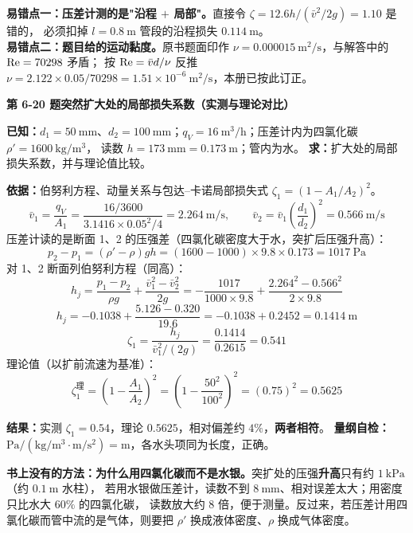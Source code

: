 \begin{yicuo}
\textbf{易错点一：压差计测的是"沿程 $+$ 局部"。}直接令 $\zeta=12.6h/(\bar v^2/2g)=1.10$ 是错的，
必须扣掉 $l=0.8\ \mathrm{m}$ 管段的沿程损失 $0.114\ \mathrm{m}$。\\
\textbf{易错点二：题目给的运动黏度。}原书题面印作 $\nu=0.000015\ \mathrm{m^2/s}$，与解答中的 $\mathrm{Re}=70298$ 矛盾；
按 $\mathrm{Re}=\bar vd/\nu$ 反推 $\nu=2.122\times0.05/70298=1.51\times10^{-6}\ \mathrm{m^2/s}$，本册已按此订正。
\end{yicuo}

\noindent\textbf{第 6-20 题\quad 突然扩大处的局部损失系数（实测与理论对比）}

\begin{jie}
\textbf{已知：}$d_1=50\ \mathrm{mm}$、$d_2=100\ \mathrm{mm}$；$q_V=16\ \mathrm{m^3/h}$；压差计内为四氯化碳 $\rho'=1600\ \mathrm{kg/m^3}$，
读数 $h=173\ \mathrm{mm}=0.173\ \mathrm{m}$；管内为水。
\textbf{求：}扩大处的局部损失系数，并与理论值比较。

\textbf{依据：}伯努利方程、动量关系与包达--卡诺局部损失式 $\zeta_1=(1-A_1/A_2)^2$。
\[ \bar v_1=\frac{q_V}{A_1}=\frac{16/3600}{3.1416\times0.05^2/4}=2.264\ \mathrm{m/s},\qquad
\bar v_2=\bar v_1\left(\frac{d_1}{d_2}\right)^2=0.566\ \mathrm{m/s} \]
压差计读的是断面 1、2 的压强差（四氯化碳密度大于水，突扩后压强升高）：
\[ p_2-p_1=(\rho'-\rho)gh=(1600-1000)\times9.8\times0.173=1017\ \mathrm{Pa} \]
对 1、2 断面列伯努利方程（同高）：
\[ h_j=\frac{p_1-p_2}{\rho g}+\frac{\bar v_1^2-\bar v_2^2}{2g}
=-\frac{1017}{1000\times9.8}+\frac{2.264^2-0.566^2}{2\times9.8} \]
\[ h_j=-0.1038+\frac{5.126-0.320}{19.6}=-0.1038+0.2452=0.1414\ \mathrm{m} \]
\[ \zeta_1=\frac{h_j}{\bar v_1^2/(2g)}=\frac{0.1414}{0.2615}=0.541 \]
理论值（以扩前流速为基准）：
\[ \zeta_1^{\text{理}}=\left(1-\frac{A_1}{A_2}\right)^2=\left(1-\frac{50^2}{100^2}\right)^2=(0.75)^2=0.5625 \]

\textbf{结果：}实测 $\zeta_1=0.54$，理论 $0.5625$，相对偏差约 $4\%$，\textbf{两者相符}。
\textbf{量纲自检：}$\mathrm{Pa/(kg/m^3\cdot m/s^2)}=\mathrm{m}$，各水头项同为长度，正确。
\end{jie}

\begin{tishi}
\textbf{书上没有的方法：为什么用四氯化碳而不是水银。}突扩处的压强\textbf{升高}只有约 $1\ \mathrm{kPa}$（约 $0.1\ \mathrm{m}$ 水柱），
若用水银做压差计，读数不到 $8\ \mathrm{mm}$、相对误差太大；用密度只比水大 $60\%$ 的四氯化碳，
读数放大约 $8$ 倍，便于测量。反过来，若压差计用四氯化碳而管中流的是气体，则要把 $\rho'$ 换成液体密度、$\rho$ 换成气体密度。
\end{tishi}

